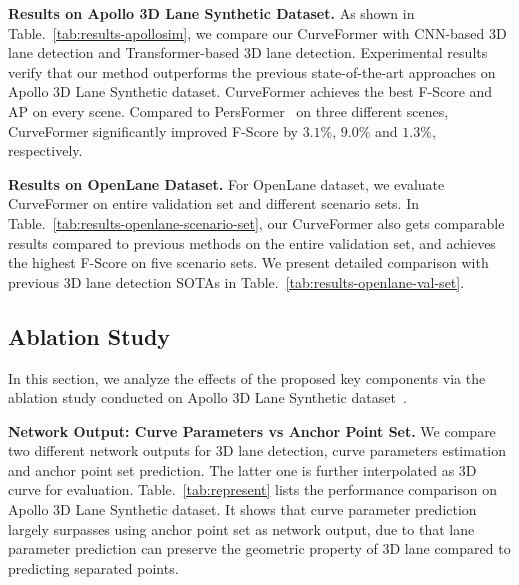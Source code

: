\documentclass[letterpaper, 10 pt, conference]{ieeeconf}
\begin{document}
\textbf{Results on Apollo 3D Lane Synthetic Dataset.} As shown in Table.~\ref{tab:results-apollosim}, we compare our CurveFormer with CNN-based 3D lane detection and Transformer-based 3D lane detection. Experimental results verify that our method outperforms the previous state-of-the-art approaches on Apollo 3D Lane Synthetic dataset. 
CurveFormer achieves the best F-Score and AP on every scene. Compared to PersFormer~\cite{chen2022persformer} on three different scenes, CurveFormer significantly improved F-Score by $3.1\%$,  $9.0\%$ and $1.3\%$, respectively. 



\textbf{Results on OpenLane Dataset.} For OpenLane dataset, we evaluate CurveFormer on entire validation set and different scenario sets.
In Table.~\ref{tab:results-openlane-scenario-set}, our CurveFormer also gets comparable results compared to previous methods on the entire validation set, and achieves the highest F-Score on five scenario sets. We present detailed comparison with previous 3D lane detection SOTAs in Table.~\ref{tab:results-openlane-val-set}.





\subsection{Ablation Study}
In this section, we analyze the effects of the proposed key components via the ablation study conducted on Apollo 3D Lane Synthetic dataset~\cite{guo2020gen}. 

\textbf{Network Output: Curve Parameters vs Anchor Point Set.} 
We compare two different network outputs for 3D lane detection, curve parameters estimation and anchor point set prediction. The latter one is further interpolated as 3D curve for evaluation. Table.~\ref{tab:represent} lists the performance comparison on Apollo 3D Lane Synthetic dataset.
It shows that curve parameter prediction largely surpasses using anchor point set as network output, due to that lane parameter prediction can preserve the geometric property of 3D lane compared to predicting separated points.
\end{document}
